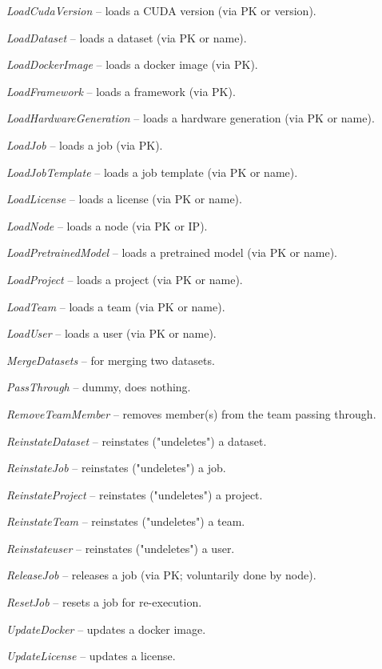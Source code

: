 \documentclass[a4paper]{book}
\begin{document}
\begin{tight_itemize}
  \item \textit{LoadCudaVersion} -- loads a CUDA version (via PK or version).
  \item \textit{LoadDataset} -- loads a dataset (via PK or name).
  \item \textit{LoadDockerImage} -- loads a docker image (via PK).
  \item \textit{LoadFramework} -- loads a framework (via PK).
  \item \textit{LoadHardwareGeneration} -- loads a hardware generation (via PK or name).
  \item \textit{LoadJob} -- loads a job (via PK).
  \item \textit{LoadJobTemplate} -- loads a job template (via PK or name).
  \item \textit{LoadLicense} -- loads a license (via PK or name).
  \item \textit{LoadNode} -- loads a node (via PK or IP).
  \item \textit{LoadPretrainedModel} -- loads a pretrained model (via PK or name).
  \item \textit{LoadProject} -- loads a project (via PK or name).
  \item \textit{LoadTeam} -- loads a team (via PK or name).
  \item \textit{LoadUser} -- loads a user (via PK or name).
  \item \textit{MergeDatasets} -- for merging two datasets.
  \item \textit{PassThrough} -- dummy, does nothing.
  \item \textit{RemoveTeamMember} -- removes member(s) from the team passing through.
  \item \textit{ReinstateDataset} -- reinstates ("undeletes") a dataset.
  \item \textit{ReinstateJob} -- reinstates ("undeletes") a job.
  \item \textit{ReinstateProject} -- reinstates ("undeletes") a project.
  \item \textit{ReinstateTeam} -- reinstates ("undeletes") a team.
  \item \textit{Reinstateuser} -- reinstates ("undeletes") a user.
  \item \textit{ReleaseJob} -- releases a job (via PK; voluntarily done by node).
  \item \textit{ResetJob} -- resets a job for re-execution.
  \item \textit{UpdateDocker} -- updates a docker image.
  \item \textit{UpdateLicense} -- updates a license.

\end{tight_itemize}
\end{document}
